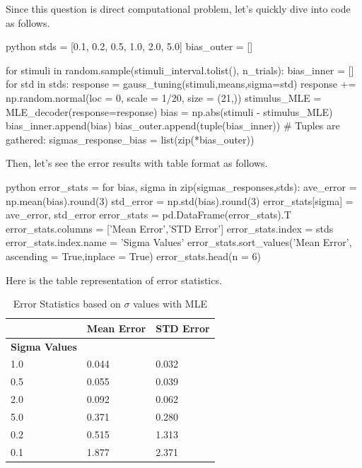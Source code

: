 \documentclass[12pt]{amsart}
\begin{document}
\bigskip
Since this question is direct computational problem, let's quickly dive into code as follows.


\begin{mintedbox}{python}
stds = [0.1, 0.2, 0.5, 1.0, 2.0, 5.0]
bias_outer = []

for stimuli in random.sample(stimuli_interval.tolist(), n_trials):
    bias_inner = []
    for std in stds:
        response = gauss_tuning(stimuli,means,sigma=std)
        response += np.random.normal(loc = 0, scale = 1/20, size = (21,)) 
        stimulus_MLE = MLE_decoder(response=response)
        bias = np.abs(stimuli - stimulus_MLE)
        bias_inner.append(bias)
    bias_outer.append(tuple(bias_inner))
 # Tuples are gathered:
sigmas_response_bias = list(zip(*bias_outer)) 
\end{mintedbox}

Then, let's see the error results with table format as follows.

\begin{mintedbox}{python}
error_stats = {}
for bias, sigma in zip(sigmas_responses,stds):
    ave_error = np.mean(bias).round(3)
    std_error = np.std(bias).round(3)
    error_stats[sigma] = ave_error, std_error
error_stats = pd.DataFrame(error_stats).T
error_stats.columns = ['Mean Error','STD Error']
error_stats.index = stds
error_stats.index.name = 'Sigma Values'
error_stats.sort_values('Mean Error', ascending = True,inplace = True)
error_stats.head(n = 6) 
\end{mintedbox}


Here is the table representation of error statistics.



% 
\begin{table}[]
\begin{tabular}{@{}lll@{}}
\toprule
             & \textbf{Mean Error} & \textbf{STD Error} \\ \midrule
\textbf{Sigma Values} &                     &                    \\
1.0          & 0.044               & 0.032              \\
0.5          & 0.055               & 0.039              \\
2.0          & 0.092               & 0.062              \\
5.0          & 0.371               & 0.280              \\
0.2          & 0.515               & 1.313              \\
0.1          & 1.877               & 2.371              \\ \bottomrule
\end{tabular}
\caption{\label{tab:table-name}Error Statistics based on $\sigma$ values with MLE}
\end{table}
\end{document}
